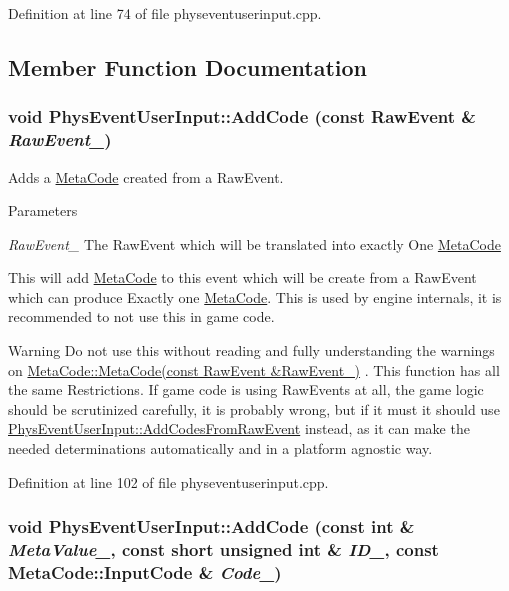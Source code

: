 Definition at line 74 of file physeventuserinput.cpp.

\subsection{Member Function Documentation}
\hypertarget{classPhysEventUserInput_a385a4f7a6e88be43b6ba1ffc2a1bb5e3}{
\subsubsection[{AddCode}]{\setlength{\rightskip}{0pt plus 5cm}void PhysEventUserInput::AddCode (const RawEvent \& {\em RawEvent\_\-})}}
\label{dc/d0e/classPhysEventUserInput_a385a4f7a6e88be43b6ba1ffc2a1bb5e3}


Adds a \hyperlink{classMetaCode}{MetaCode} created from a RawEvent. 
\begin{DoxyParams}{Parameters}
\item[{\em RawEvent\_\-}]The RawEvent which will be translated into exactly One \hyperlink{classMetaCode}{MetaCode}\end{DoxyParams}
This will add \hyperlink{classMetaCode}{MetaCode} to this event which will be create from a RawEvent which can produce Exactly one \hyperlink{classMetaCode}{MetaCode}. This is used by engine internals, it is recommended to not use this in game code. \begin{DoxyWarning}{Warning}
Do not use this without reading and fully understanding the warnings on \hyperlink{classMetaCode_a87b260ce7ee3a66c75320c0fc37cdc0a}{MetaCode::MetaCode(const RawEvent \&RawEvent\_\-)} . This function has all the same Restrictions. If game code is using RawEvents at all, the game logic should be scrutinized carefully, it is probably wrong, but if it must it should use \hyperlink{classPhysEventUserInput_a9e42f42f9a4a42f792e5cf95856669c0}{PhysEventUserInput::AddCodesFromRawEvent} instead, as it can make the needed determinations automatically and in a platform agnostic way. 
\end{DoxyWarning}


Definition at line 102 of file physeventuserinput.cpp.\hypertarget{classPhysEventUserInput_ace3b98a502b8e784b58bc5dc599fc0c4}{
\subsubsection[{AddCode}]{\setlength{\rightskip}{0pt plus 5cm}void PhysEventUserInput::AddCode (const int \& {\em MetaValue\_\-}, \/  const short unsigned int \& {\em ID\_\-}, \/  const {\bf MetaCode::InputCode} \& {\em Code\_\-})}}
\label{dc/d0e/classPhysEventUserInput_ace3b98a502b8e784b58bc5dc599fc0c4}


